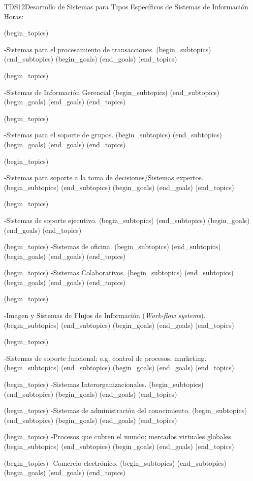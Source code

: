 \begin{BKL2}{TDS12}{Desarrollo de Sistemas para Tipos Específicos de Sistemas de Información}
Horas:
 
(begin_topics)

-Sistemas para el procesamiento de transacciones.
(begin_subtopics)
(end_subtopics)
(begin_goals)
(end_goals)
(end_topics)

 

(begin_topics)

-Sistemas de Información Gerencial
(begin_subtopics)
(end_subtopics)
(begin_goals)
(end_goals)
(end_topics)

 

(begin_topics)

-Sistemas para el soporte de grupos.
(begin_subtopics)
(end_subtopics)
(begin_goals)
(end_goals)
(end_topics)

 

(begin_topics)

-Sistemas para soporte a la toma de decisiones/Sistemas expertos.
(begin_subtopics)
(end_subtopics)
(begin_goals)
(end_goals)
(end_topics)

 

(begin_topics)

-Sistemas de soporte ejecutivo.
(begin_subtopics)
(end_subtopics)
(begin_goals)
(end_goals)
(end_topics)

 

(begin_topics)
-Sistemas de oficina.
(begin_subtopics)
(end_subtopics)
(begin_goals)
(end_goals)
(end_topics)

 

(begin_topics)
-Sistemas Colaborativos.
(begin_subtopics)
(end_subtopics)
(begin_goals)
(end_goals)
(end_topics)

 

(begin_topics)

-Imagen y Sistemas de Flujos de Información (\textit{Work-flow systems}).
(begin_subtopics)
(end_subtopics)
(begin_goals)
(end_goals)
(end_topics)

 

(begin_topics)

-Sistemas de soporte funcional: e.g. control de procesos, marketing.
(begin_subtopics)
(end_subtopics)
(begin_goals)
(end_goals)
(end_topics)

 

(begin_topics)
-Sistemas Interorganizacionales.
(begin_subtopics)
(end_subtopics)
(begin_goals)
(end_goals)
(end_topics)

(begin_topics)
-Sistemas de administración del conocimiento.
(begin_subtopics)
(end_subtopics)
(begin_goals)
(end_goals)
(end_topics)

(begin_topics)
-Procesos que cubren el mundo; mercados virtuales globales.
(begin_subtopics)
(end_subtopics)
(begin_goals)
(end_goals)
(end_topics)

(begin_topics)
-Comercio electrónico.
(begin_subtopics)
(end_subtopics)
(begin_goals)
(end_goals)
(end_topics)

\end{BKL2}


